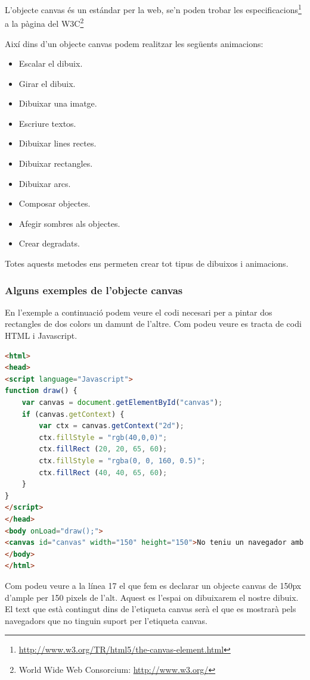 L'objecte canvas és un estándar per la web, se'n poden trobar les especificacions\footnote{\url{http://www.w3.org/TR/html5/the-canvas-element.html}} a la pàgina del W3C\footnote{World Wide Web Consorcium: \url{http://www.w3.org/}}

Així dins d'un objecte canvas podem realitzar les següents animacions: 

\begin{itemize}
\item{Escalar el dibuix.}
\item{Girar el dibuix.}
\item{Dibuixar una imatge.}
\item{Escriure textos.}
\item{Dibuixar lines rectes.}
\item{Dibuixar rectangles.}
\item{Dibuixar arcs.}
\item{Composar objectes.}
\item{Afegir sombres als objectes.}
\item{Crear degradats.}
\end{itemize}

Totes aquests metodes ens permeten crear tot tipus de dibuixos i animacions.

\newpage

\subsubsection{Alguns exemples de l'objecte canvas}

En l'exemple a continuació podem veure el codi necesari per a pintar dos rectangles de dos colors un damunt de l'altre. Com podeu veure es tracta de codi HTML i Javascript.  

\begin{lstlisting}[language=html]
<html>
<head>
<script language="Javascript">
function draw() {
    var canvas = document.getElementById("canvas");
    if (canvas.getContext) {
        var ctx = canvas.getContext("2d");
        ctx.fillStyle = "rgb(40,0,0)";
        ctx.fillRect (20, 20, 65, 60);
        ctx.fillStyle = "rgba(0, 0, 160, 0.5)";
        ctx.fillRect (40, 40, 65, 60);
    }
}
</script>
</head>
<body onLoad="draw();">
<canvas id="canvas" width="150" height="150">No teniu un navegador amb suport per visualitzar elements canvias.</canvas>
</body>
</html>
\end{lstlisting}

Com podeu veure a la línea 17 el que fem es declarar un objecte canvas de 150px d'ample per 150 pixels de l'alt. Aquest es l'espai on dibuixarem el nostre dibuix. El text que està contingut dins de l'etiqueta canvas serà el que es mostrarà pels navegadors que no tinguin suport per l'etiqueta canvas. 


